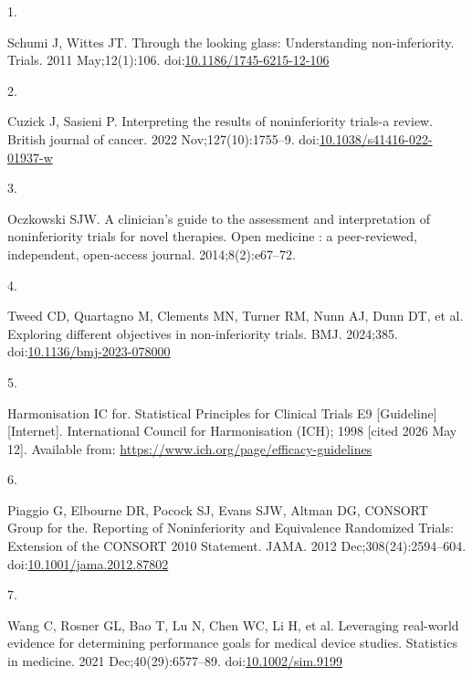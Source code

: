 \documentclass{article}
\newlength{\cslhangindent}
\newlength{\csllabelwidth}
\newenvironment{CSLReferences}[2] %
 {\begin{list}{}{%
  \setlength{\itemindent}{0pt}
  \setlength{\leftmargin}{0pt}
  \setlength{\parsep}{0pt}
  \ifodd #1
   \setlength{\leftmargin}{\cslhangindent}
   \setlength{\itemindent}{-1\cslhangindent}
  \fi
  \setlength{\itemsep}{#2\baselineskip}}}
 {\end{list}}
\newcommand{\CSLLeftMargin}[1]{\parbox[t]{\csllabelwidth}{#1}}
\newcommand{\CSLRightInline}[1]{\parbox[t]{\linewidth - \csllabelwidth}{#1}\break}
\begin{document}
\begin{CSLReferences}{0}{1}
\CSLLeftMargin{1. }%
\CSLRightInline{Schumi J, Wittes JT. Through the looking glass:
Understanding non-inferiority. Trials. 2011 May;12(1):106.
doi:\href{https://doi.org/10.1186/1745-6215-12-106}{10.1186/1745-6215-12-106}}

\CSLLeftMargin{2. }%
\CSLRightInline{Cuzick J, Sasieni P. Interpreting the results of
noninferiority trials-a review. British journal of cancer. 2022
Nov;127(10):1755--9.
doi:\href{https://doi.org/10.1038/s41416-022-01937-w}{10.1038/s41416-022-01937-w}}

\CSLLeftMargin{3. }%
\CSLRightInline{Oczkowski SJW. A clinician's guide to the assessment and
interpretation of noninferiority trials for novel therapies. Open
medicine : a peer-reviewed, independent, open-access journal.
2014;8(2):e67--72.}

\CSLLeftMargin{4. }%
\CSLRightInline{Tweed CD, Quartagno M, Clements MN, Turner RM, Nunn AJ,
Dunn DT, et al. Exploring different objectives in non-inferiority
trials. BMJ. 2024;385.
doi:\href{https://doi.org/10.1136/bmj-2023-078000}{10.1136/bmj-2023-078000}}

\CSLLeftMargin{5. }%
\CSLRightInline{Harmonisation IC for. Statistical {Principles} for
{Clinical} {Trials} {E9} {[}Guideline{]} {[}Internet{]}. International
Council for Harmonisation (ICH); 1998 {[}cited 2026 May 12{]}. Available
from: \url{https://www.ich.org/page/efficacy-guidelines}}

\CSLLeftMargin{6. }%
\CSLRightInline{{Piaggio G, Elbourne DR, Pocock SJ, Evans SJW, Altman
DG, CONSORT Group for the}. Reporting of {Noninferiority} and
{Equivalence} {Randomized} {Trials}: {Extension} of the {CONSORT} 2010
{Statement}. JAMA. 2012 Dec;308(24):2594--604.
doi:\href{https://doi.org/10.1001/jama.2012.87802}{10.1001/jama.2012.87802}}

\CSLLeftMargin{7. }%
\CSLRightInline{Wang C, Rosner GL, Bao T, Lu N, Chen WC, Li H, et al.
Leveraging real-world evidence for determining performance goals for
medical device studies. Statistics in medicine. 2021
Dec;40(29):6577--89.
doi:\href{https://doi.org/10.1002/sim.9199}{10.1002/sim.9199}}


\end{CSLReferences}
\end{document}
